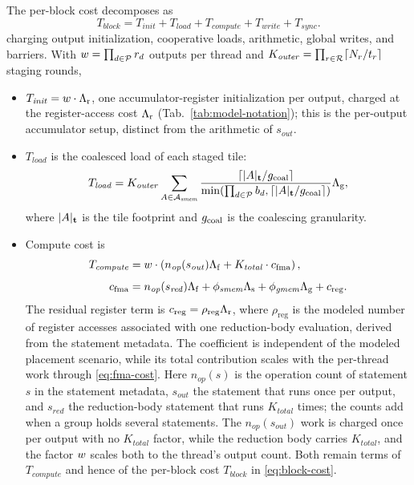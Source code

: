 The per-block cost decomposes as
\begin{equation}
T_{\mathit{block}}
= T_{\mathit{init}} + T_{\mathit{load}} + T_{\mathit{compute}} +
   T_{\mathit{write}} + T_{\mathit{sync}}.
\label{eq:block-cost}
\end{equation}
charging output initialization, cooperative loads, arithmetic, global writes, and barriers. With \(w=\prod_{d\in\mathcal{P}}r_d\) outputs per thread and \(K_{\mathit{outer}}=\prod_{r\in\mathcal{R}}\lceil N_r/t_r\rceil\) staging rounds,
\begin{itemize}
  \item \(T_{\mathit{init}} = w \cdot \Lambda_{\mathrm r}\), one accumulator-register initialization per output, charged at the register-access cost \(\Lambda_{\mathrm r}\) (Tab.~\ref{tab:model-notation}); this is the per-output accumulator setup, distinct from the arithmetic of \(s_{\mathit{out}}\).
  \item \(T_{\mathit{load}}\) is the coalesced load of each staged tile:
  \[
  T_{\mathit{load}} = K_{\mathit{outer}}\sum_{A \in \mathcal{A}_{\mathit{smem}}}
  \frac{\lceil |A|_{\mathbf{t}} / g_{\mathrm{coal}} \rceil}
       {\min(\prod_{d \in \mathcal{P}} b_d,\lceil |A|_{\mathbf{t}} / g_{\mathrm{coal}} \rceil)}
  \Lambda_{\mathrm g},
  \]
  where \(|A|_{\mathbf{t}}\) is the tile footprint and \(g_{\mathrm{coal}}\) is the coalescing granularity.
  \item Compute cost is
  \begin{equation}
	  \begin{aligned}
	  T_{\mathit{compute}} &= w \cdot
	    \left(n_{\mathit{op}}(s_{\mathit{out}})\Lambda_{\mathrm f}
	    + K_{\mathit{total}}\cdot c_{\mathrm{fma}}\right),\\[1ex]
	  c_{\mathrm{fma}} &= n_{\mathit{op}}(s_{\mathit{red}})\Lambda_{\mathrm f}
	  + \phi_{\mathit{smem}}\Lambda_{\mathrm s}
	  + \phi_{\mathit{gmem}}\Lambda_{\mathrm g}
	  + c_{\mathrm{reg}}.
	  \end{aligned}
	  \label{eq:fma-cost}
	  \end{equation}
	  The residual register term is \(c_{\mathrm{reg}}=\rho_{\mathrm{reg}}\Lambda_{\mathrm r}\), where \(\rho_{\mathrm{reg}}\) is the modeled number of register accesses associated with one reduction-body evaluation, derived from the statement metadata. The coefficient is independent of the modeled placement scenario, while its total contribution scales with the per-thread work through \autoref{eq:fma-cost}. Here \(n_{\mathit{op}}(s)\) is the operation count of statement \(s\) in the statement metadata, \(s_{\mathit{out}}\) the statement that runs once per output, and \(s_{\mathit{red}}\) the reduction-body statement that runs \(K_{\mathit{total}}\) times; the counts add when a group holds several statements. The \(n_{\mathit{op}}(s_{\mathit{out}})\) work is charged once per output with no \(K_{\mathit{total}}\) factor, while the reduction body carries \(K_{\mathit{total}}\), and the factor \(w\) scales both to the thread's output count. Both remain terms of \(T_{\mathit{compute}}\) and hence of the per-block cost \(T_{\mathit{block}}\) in \autoref{eq:block-cost}.

\end{itemize}
